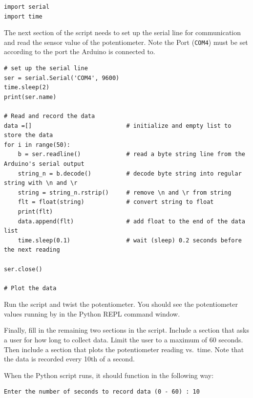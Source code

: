 \documentclass[11pt]{article}
\begin{document}
\begin{verbatim}
import serial
import time
\end{verbatim}

The next section of the script needs to set up the serial line for
communication and read the sensor value of the potentiometer. Note the
Port (\texttt{\textquotesingle{}COM4\textquotesingle{}}) must be set
according to the port the Arduino is connected to.

\begin{verbatim}
# set up the serial line
ser = serial.Serial('COM4', 9600)
time.sleep(2)
print(ser.name)

# Read and record the data
data =[]                           # initialize and empty list to store the data
for i in range(50):
    b = ser.readline()             # read a byte string line from the Arduino's serial output
    string_n = b.decode()          # decode byte string into regular string with \n and \r 
    string = string_n.rstrip()     # remove \n and \r from string
    flt = float(string)            # convert string to float
    print(flt)
    data.append(flt)               # add float to the end of the data list
    time.sleep(0.1)                # wait (sleep) 0.2 seconds before the next reading

ser.close()

# Plot the data
\end{verbatim}

Run the script and twist the potentiometer. You should see the
potentiometer values running by in the Python REPL command window.

Finally, fill in the remaining two sections in the script. Include a
section that asks a user for how long to collect data. Limit the user to
a maximum of 60 seconds. Then include a section that plots the
potentiometer reading vs.~time. Note that the data is recorded every
10th of a second.

When the Python script runs, it should function in the following way:

\begin{verbatim}
Enter the number of seconds to record data (0 - 60) : 10
\end{verbatim}
\end{document}
